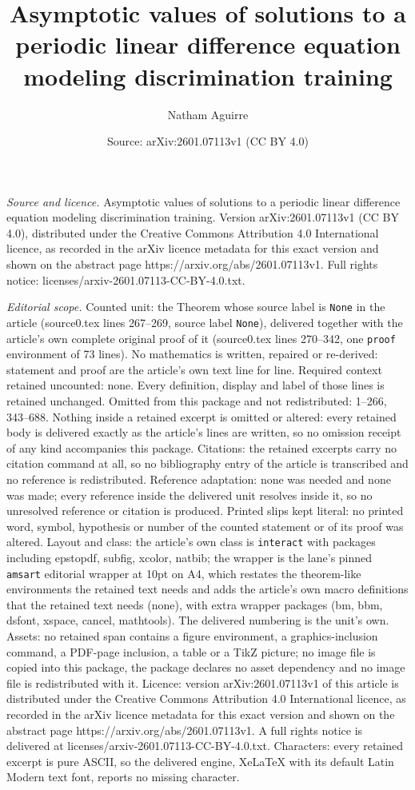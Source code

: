 \documentclass[10pt,a4paper]{amsart}
\title[Asymptotic values of solutions to a periodic linear differen]{Asymptotic values of solutions to a periodic linear difference equation modeling discrimination training}
\author{Natham Aguirre}
\date{Source: arXiv:2601.07113v1 (CC BY 4.0)}
\begin{document}
\maketitle

\noindent\emph{Source and licence.} Asymptotic values of solutions to a periodic linear difference equation modeling discrimination training. Version arXiv:2601.07113v1 (CC BY 4.0), distributed under the Creative Commons Attribution 4.0 International licence, as recorded in the arXiv licence metadata for this exact version and shown on the abstract page https://arxiv.org/abs/2601.07113v1. Full rights notice: licenses/arxiv-2601.07113-CC-BY-4.0.txt.\par\smallskip

\noindent\textit{Editorial scope.} Counted unit: the Theorem whose source label is \texttt{None} in the article (source0.tex lines 267--269, source label \texttt{None}), delivered together with the article's own complete original proof of it (source0.tex lines 270--342, one \texttt{proof} environment of 73 lines). No mathematics is written, repaired or re-derived: statement and proof are the article's own text line for line. Required context retained uncounted: none. Every definition, display and label of those lines is retained unchanged. Omitted from this package and not redistributed: 1--266, 343--688. Nothing inside a retained excerpt is omitted or altered: every retained body is delivered exactly as the article's lines are written, so no omission receipt of any kind accompanies this package. Citations: the retained excerpts carry no citation command at all, so no bibliography entry of the article is transcribed and no reference is redistributed. Reference adaptation: none was needed and none was made; every reference inside the delivered unit resolves inside it, so no unresolved reference or citation is produced. Printed slips kept literal: no printed word, symbol, hypothesis or number of the counted statement or of its proof was altered. Layout and class: the article's own class is \texttt{interact} with packages including epstopdf, subfig, xcolor, natbib; the wrapper is the lane's pinned \texttt{amsart} editorial wrapper at 10pt on A4, which restates the theorem-like environments the retained text needs and adds the article's own macro definitions that the retained text needs (none), with extra wrapper packages (bm, bbm, dsfont, xspace, cancel, mathtools). The delivered numbering is the unit's own. Assets: no retained span contains a figure environment, a graphics-inclusion command, a PDF-page inclusion, a table or a TikZ picture; no image file is copied into this package, the package declares no asset dependency and no image file is redistributed with it. Licence: version arXiv:2601.07113v1 of this article is distributed under the Creative Commons Attribution 4.0 International licence, as recorded in the arXiv licence metadata for this exact version and shown on the abstract page https://arxiv.org/abs/2601.07113v1. A full rights notice is delivered at licenses/arxiv-2601.07113-CC-BY-4.0.txt. Characters: every retained excerpt is pure ASCII, so the delivered engine, XeLaTeX with its default Latin Modern text font, reports no missing character.
\end{document}
